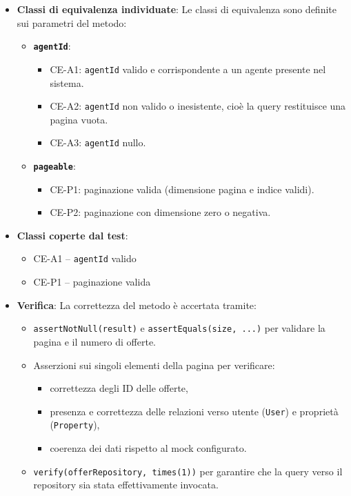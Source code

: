 \documentclass{book}
\begin{document}
\begin{itemize}

\item \textbf{Classi di equivalenza individuate}:  
Le classi di equivalenza sono definite sui parametri del metodo:

\begin{itemize}
    \item \textbf{\texttt{agentId}}:
    \begin{itemize}
        \item CE-A1: \texttt{agentId} valido e corrispondente a un agente presente nel sistema.
        \item CE-A2: \texttt{agentId} non valido o inesistente, cioè la query restituisce una pagina vuota.
        \item CE-A3: \texttt{agentId} nullo.
    \end{itemize}
    \item \textbf{\texttt{pageable}}:
    \begin{itemize}
        \item CE-P1: paginazione valida (dimensione pagina e indice validi).
        \item CE-P2: paginazione con dimensione zero o negativa.
    \end{itemize}
\end{itemize}

\item \textbf{Classi coperte dal test}:
\begin{itemize}
    \item CE-A1 – \texttt{agentId} valido
    \item CE-P1 – paginazione valida
\end{itemize}

\item \textbf{Verifica}:  
La correttezza del metodo è accertata tramite:
\begin{itemize}
    \item \texttt{assertNotNull(result)} e \texttt{assertEquals(size, ...)} per validare la pagina e il numero di offerte.
    \item Asserzioni sui singoli elementi della pagina per verificare:
    \begin{itemize}
        \item correttezza degli ID delle offerte,
        \item presenza e correttezza delle relazioni verso utente (\texttt{User}) e proprietà (\texttt{Property}),
        \item coerenza dei dati rispetto al mock configurato.
    \end{itemize}
    \item \texttt{verify(offerRepository, times(1))} per garantire che la query verso il repository sia stata effettivamente invocata.
\end{itemize}


\end{itemize}
\clearpage
\end{document}
